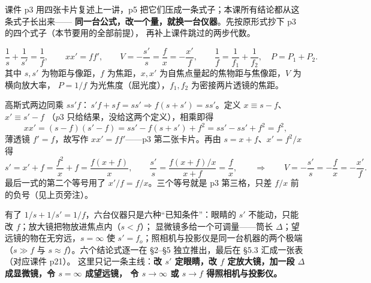 ﻿\documentclass[11pt]{ctexart}
\renewcommand{\flowerrule}{\par\vspace{2pt}\noindent\makebox[\linewidth]{\color{petal}\rule{0.22\linewidth}{0.6pt}\hspace{8pt}{\small\ding{95}}\hspace{4pt}\raisebox{1.1pt}{\tiny\ding{95}}\hspace{4pt}{\small\ding{95}}\hspace{8pt}\rule{0.22\linewidth}{0.6pt}}\par\vspace{2pt}}
\begin{document}

课件 p3 用四张卡片复述上一讲，p5 把它们压成一条式子；本课所有结论都从这条式子长出来——
\textbf{同一台公式，改一个量，就换一台仪器}。先按原形式抄下 p3 的四个式子（本节要用的全部前提），
再补上课件跳过的两步代数。

\[
\frac{1}{s}+\frac{1}{s'}=\frac{1}{f},
\qquad
xx'=ff',
\qquad
V=-\frac{s'}{s}=\frac{f}{x}=-\frac{x'}{f},
\qquad
\frac{1}{f}=\frac{1}{f_1}+\frac{1}{f_2},\quad P=P_1+P_2 .
\]
其中 $s,s'$ 为物距与像距，$f$ 为焦距，$x,x'$ 为自焦点量起的焦物距与焦像距，$V$ 为横向放大率，
$P=1/f$ 为光焦度（屈光度），$f_1,f_2$ 为密接两片透镜的焦距。



高斯式两边同乘 $ss'f$：$\,s'f+sf=ss'\Rightarrow f(s+s')=ss'$。定义 $x\equiv s-f$、$x'\equiv s'-f$
（$p3$ 只给结果，没给这两个定义），相乘即得
\[
xx'=(s-f)(s'-f)=ss'-f(s+s')+f^2=ss'-ss'+f^2=f^2 ,
\]
薄透镜 $f'=f$，故写作 $xx'=ff'$——p3 第二张卡片。再由 $s=x+f$、$x'=f^2/x$ 得
\[
s'=x'+f=\frac{f^2}{x}+f=\frac{f(x+f)}{x},\qquad
\frac{s'}{s}=\frac{f(x+f)/x}{x+f}=\frac{f}{x},
\qquad\Longrightarrow\qquad
V=-\frac{s'}{s}=-\frac{f}{x}=-\frac{x'}{f}.
\]
最后一式的第二个等号用了 $x'/f=f/x$。三个等号就是 p3 第三格，只差 $f/x$ 前的负号（见上页旁注）。


有了 $1/s+1/s'=1/f$，六台仪器只是六种“已知条件”：眼睛的 $s'$ 不能动，只能改 $f$；放大镜把物放进焦点内（$s<f$）；
显微镜多给一个可调量——筒长 $\Delta$；望远镜的物在无穷远，$s=\infty$ 使 $s'=f_o$；照相机与投影仪是同一台机器的两个极端
（$s\gg f$ 与 $s\approx f$）。六个结论式逐一在 §2--§5 独立推出，最后在 §5.3 汇成一张表（对应课件 p21）。
这里只记一条主线：\textbf{改 $s'$ 定眼睛，改 $f$ 定放大镜，加一段 $\Delta$ 成显微镜，令 $s=\infty$ 成望远镜，
令 $s\to\infty$ 或 $s\to f$ 得照相机与投影仪。}

\flowerrule


\end{document}
